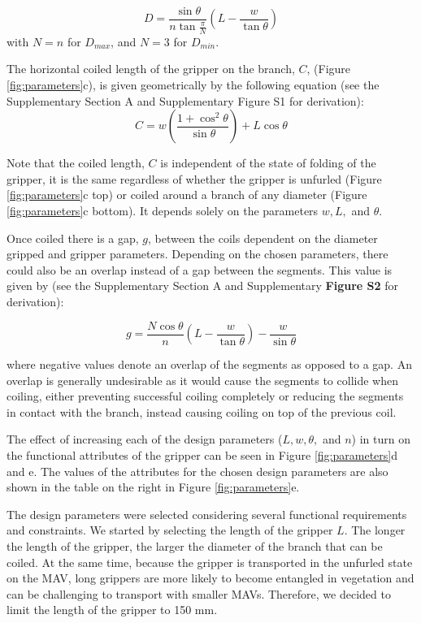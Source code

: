 \begin{equation}
    D = \frac{\sin \theta}{n \tan \frac{\pi}{N}} \left( L - \frac{w}{\tan \theta}\right)
    \label{eq:diameter}
\end{equation}
with $N=n$ for $D_{max}$, and $N=3$ for $D_{min}$.

The horizontal coiled length of the gripper on the branch, $C$, (Figure \ref{fig:parameters}c), is given geometrically by the following equation (see the Supplementary Section A and Supplementary Figure S1 for derivation):
\begin{equation}
    C = w\left( \frac{1+\cos^2 \theta}{\sin \theta} \right) + L\cos \theta
    \label{eq:coiled_length}
\end{equation}

Note that the coiled length, $C$ is independent of the state of folding of the gripper, it is the same regardless of whether the gripper is unfurled (Figure \ref{fig:parameters}c top) or coiled around a branch of any diameter (Figure \ref{fig:parameters}c bottom). It depends solely on the parameters $w,L,$ and $\theta$. 

Once coiled there is a gap, $g$, between the coils dependent on the diameter gripped and gripper parameters. Depending on the chosen parameters, there could also be an overlap instead of a gap between the segments. This value is given by (see the Supplementary Section A and Supplementary \textbf{Figure S2} for derivation):

\begin{equation}
    g = \frac{N \cos \theta}{n}\left(L - \frac{w}{\tan \theta}\right) - \frac{w}{\sin \theta}
    \label{eq:gap}
\end{equation}

where negative values denote an overlap of the segments as opposed to a gap. An overlap is generally undesirable as it would cause the segments to collide when coiling, either preventing successful coiling completely or reducing the segments in contact with the branch, instead causing coiling on top of the previous coil.

The effect of increasing each of the design parameters ($L, w, \theta,$ and $n$) in turn on the functional attributes of the gripper can be seen in Figure \ref{fig:parameters}d and e. The values of the attributes for the chosen design parameters are also shown in the table on the right in Figure \ref{fig:parameters}e.

The design parameters were selected considering several functional requirements and constraints. We started by selecting the length of the gripper $L$. 
The longer the length of the gripper, the larger the diameter of the branch that can be coiled. At the same time, because the gripper is transported in the unfurled state on the MAV, long grippers are more likely to become entangled in vegetation and can be challenging to transport with smaller MAVs. Therefore, we decided to limit the length of the gripper to 150 mm.

